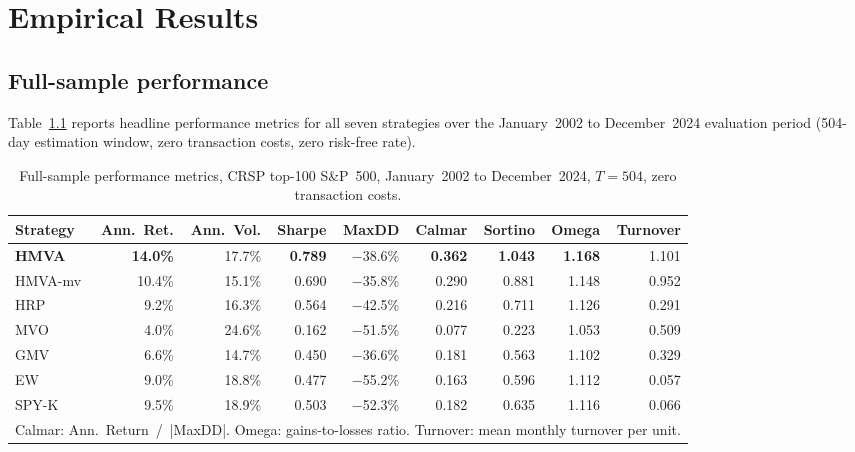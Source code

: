\documentclass[a4paper,12pt]{report}
\begin{document}
\chapter{Empirical Results}
\label{ch:results}

\section{Full-sample performance}
\label{sec:res-main}

Table~\ref{tab:res-main} reports headline performance metrics for all seven
strategies over the January~2002 to December~2024 evaluation period (504-day
estimation window, zero transaction costs, zero risk-free rate).

\begin{table}[H]
  \centering
  \caption{Full-sample performance metrics, CRSP top-100 S\&P~500,
           January~2002 to December~2024, $T=504$, zero transaction costs.}
  \label{tab:res-main}
  \begin{tabular}{@{}lrrrrrrrr@{}}
    \toprule
    Strategy & Ann.\ Ret. & Ann.\ Vol. & Sharpe & MaxDD & Calmar & Sortino
             & Omega & Turnover \\
    \midrule
    \textbf{HMVA}
      & \textbf{14.0\%} & 17.7\% & \textbf{0.789} & $-$38.6\%
      & \textbf{0.362} & \textbf{1.043} & \textbf{1.168} & 1.101 \\
    HMVA-mv
      & 10.4\% & 15.1\% & 0.690 & $-$35.8\%
      & 0.290 & 0.881 & 1.148 & 0.952 \\
    HRP
      & 9.2\%  & 16.3\% & 0.564 & $-$42.5\%
      & 0.216 & 0.711 & 1.126 & 0.291 \\
    MVO
      & 4.0\%  & 24.6\% & 0.162 & $-$51.5\%
      & 0.077 & 0.223 & 1.053 & 0.509 \\
    GMV
      & 6.6\%  & 14.7\% & 0.450 & $-$36.6\%
      & 0.181 & 0.563 & 1.102 & 0.329 \\
    EW
      & 9.0\%  & 18.8\% & 0.477 & $-$55.2\%
      & 0.163 & 0.596 & 1.112 & 0.057 \\
    SPY-K
      & 9.5\%  & 18.9\% & 0.503 & $-$52.3\%
      & 0.182 & 0.635 & 1.116 & 0.066 \\
    \bottomrule
    \multicolumn{9}{l}{\small Calmar: Ann.\ Return~/~|MaxDD|.
      Omega: gains-to-losses ratio.
      Turnover: mean monthly turnover per unit.} \\
  \end{tabular}
\end{table}
\end{document}
